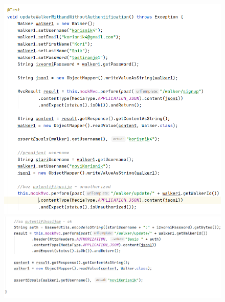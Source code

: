  		
 			
 		
 		
 			\begin{figure}[H]
 				\hspace*{-0.58in}
 					\includegraphics[scale=0.73]{slike/walker3.1.PNG}
 					\hspace*{-0.41in}
 					\includegraphics[scale=0.73]{slike/walker3.2.PNG} %
 				\centering
 			\end{figure}
 		
 			
 			
